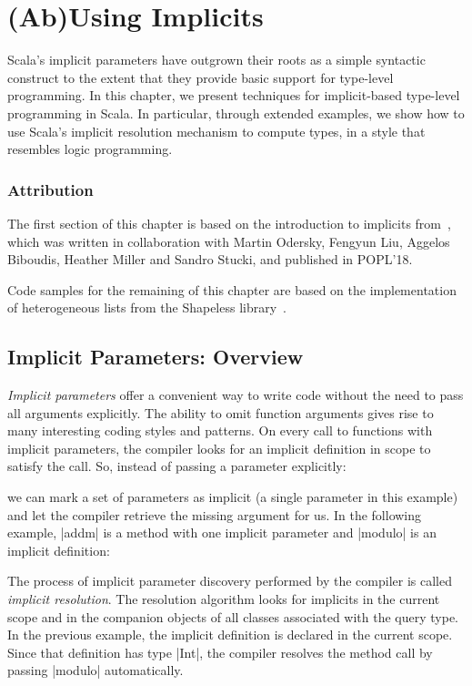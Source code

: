 \chapter{(Ab)Using Implicits}
\label{chap:ab-using-implicits}

Scala's implicit parameters have outgrown their roots as a simple syntactic construct to the extent that they provide basic support for type-level programming.
In this chapter, we present techniques for implicit-based type-level programming in Scala.
In particular, through extended examples, we show how to use Scala's implicit resolution mechanism to compute types, in a style that resembles logic programming.

\subsection*{Attribution}

The first section of this chapter is based on the introduction to implicits from~\citep{odersky2018simplicitly}, which was written in collaboration with Martin Odersky, Fengyun Liu, Aggelos Biboudis, Heather Miller and Sandro Stucki, and published in POPL'18.

Code samples for the remaining of this chapter are based on the implementation of heterogeneous lists from the Shapeless library~\citep{sabin2011shapeless}.

\section{Implicit Parameters: Overview}

\emph{Implicit parameters} offer a convenient way to write code without the need to pass all arguments explicitly.
The ability to omit function arguments gives rise to many interesting coding styles and patterns.
On every call to functions with implicit parameters, the compiler looks for an implicit definition in scope to satisfy the call.
So, instead of passing a parameter explicitly:

\explicitModulo

\noindent
we can mark a set of parameters as implicit (a single parameter in this example) and let the compiler retrieve the missing argument for us.
In the following example, |addm| is a method with one implicit parameter and |modulo| is an implicit definition:

\implicitModulo

The process of implicit parameter discovery performed by the compiler is called \emph{implicit resolution}.
The resolution algorithm looks for implicits in the current scope and in the companion objects of all classes associated with the query type.
In the previous example, the implicit definition is declared in the current scope.
Since that definition has type |Int|, the compiler resolves the method call by passing |modulo| automatically.

